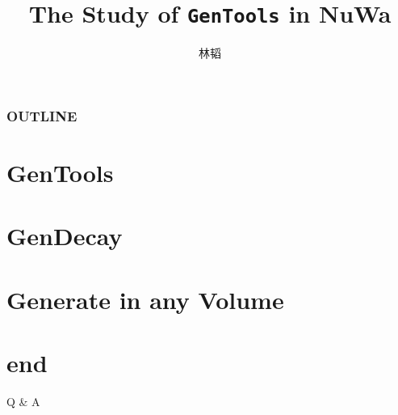 \documentclass{beamer}
\begin{document}
\title{The Study of {\tt GenTools} in NuWa}
\author{
    \texorpdfstring{林韬
                    \newline
                    \href{mailto:lintao@ihep.ac.cn}
                    {\footnotesize{}}}
                    {Lin Tao}
}

\maketitle

\begin{frame}
    \frametitle{OUTLINE}
    \tableofcontents
\end{frame}

\section{GenTools}
    
\section{GenDecay}
    
\section{Generate in any Volume}
    
\section*{end}
    
\begin{frame}
    \begin{center}
        \LARGE Q \& A
    \end{center}
\end{frame}
\end{document}
